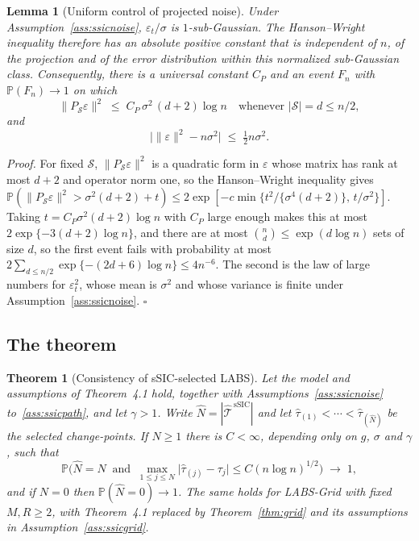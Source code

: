\documentclass[12pt, a4paper]{article}
\newcommand{\qed}{\hfill$\square$}
\newenvironment{proof}[1][Proof]{\par\noindent\textit{#1.}\space}{\qed\par\medskip}
\newtheorem{theorem}{Theorem}[section]
\newtheorem{lemma}{Lemma}[section]
\newcommand{\mainthm}{Theorem~4.1}
\begin{document}
\begin{lemma}[Uniform control of projected noise]
\label{lem:proj}
Under Assumption~\ref{ass:ssicnoise}, $\varepsilon_t/\sigma$ is
$1$-sub-Gaussian. The Hanson--Wright inequality
\citep[Theorem~1.1]{rv13} therefore has an absolute positive constant that is
independent of $n$, of the projection and of the error distribution within
this normalized sub-Gaussian class. Consequently, there is a universal
constant $C_P$ and an event $F_n$ with $\mathbb{P}(F_n)\to1$ on which
\[
\big\| P_{\mathcal{S}} \varepsilon \big\|^2 \;\le\;
C_P\, \sigma^2\, (d+2) \log n
\quad \text{whenever } |\mathcal{S}| = d \le n/2,
\]
and
\[
\Big| \|\varepsilon\|^2 - n\sigma^2 \Big| \;\le\; \tfrac12 n \sigma^2 .
\]
\end{lemma}

\begin{proof}
For fixed $\mathcal{S}$, $\|P_{\mathcal{S}}\varepsilon\|^2$ is a quadratic form in $\varepsilon$ whose matrix has rank at most $d+2$ and operator norm one, so the Hanson--Wright inequality gives $\mathbb{P}(\|P_{\mathcal{S}}\varepsilon\|^2 > \sigma^2(d+2) + t) \le 2\exp[-c\min\{t^2/\{\sigma^4 (d+2)\},\, t/\sigma^2\}]$. Taking $t = C_P\sigma^2 (d+2)\log n$ with $C_P$ large enough makes this at most $2\exp\{-3(d+2)\log n\}$, and there are at most $\binom{n}{d} \le \exp(d\log n)$ sets
of size $d$, so the first event fails with probability at most $2\sum_{d\le n/2} \exp\{-(2d+6)\log n\} \le 4n^{-6}$. The second is the law of large
numbers for $\varepsilon_t^2$, whose mean is $\sigma^2$ and whose variance is
finite under Assumption~\ref{ass:ssicnoise}.
\end{proof}

\subsection{The theorem}
\label{sup:ssicthm}

\begin{theorem}[Consistency of sSIC-selected LABS]
\label{thm:ssic}
Let the model and assumptions of \mainthm{} hold, together with
Assumptions~\ref{ass:ssicnoise} to~\ref{ass:ssicpath}, and let $\gamma > 1$.
Write $\hat N = |\hat{\mathcal{T}}^{\,\mathrm{sSIC}}|$ and let $\hat\tau_{(1)} < \cdots < \hat\tau_{(\hat N)}$ be the selected change-points. If $N \ge 1$ there is $C < \infty$, depending only on $g$, $\sigma$ and $\gamma$, such that \[ \mathbb{P}\Big( \hat N = N \ \text{ and } \ \max_{1 \le j \le N} \big| \hat\tau_{(j)} - \tau_j \big| \le C (n\log n)^{1/2} \Big) \;\longrightarrow\; 1 , \] and if $N = 0$ then $\mathbb{P}(\hat N = 0) \to 1$.
The same holds for LABS-Grid with fixed $M, R \ge 2$, with \mainthm{} replaced
by Theorem~\ref{thm:grid} and its assumptions in
Assumption~\ref{ass:ssicgrid}.
\end{theorem}
\end{document}
